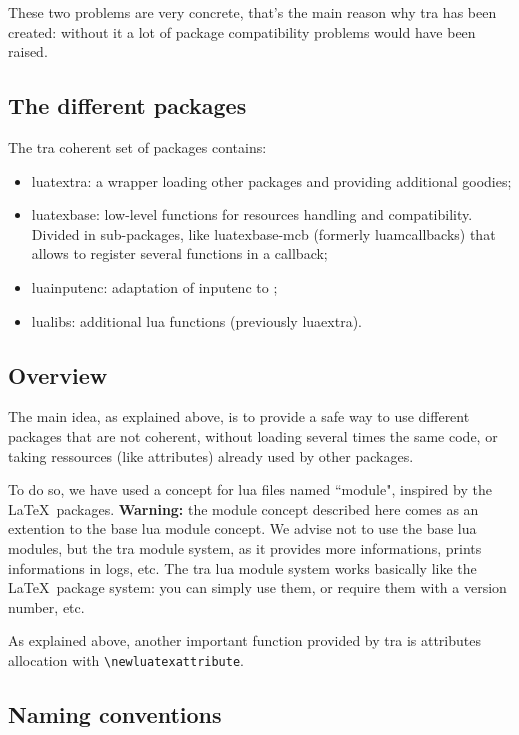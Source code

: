 \documentclass{article}
\newcommand\pf{\textsf}
\begin{document}
These two problems are very concrete, that's the main reason why \LuaTeX tra
has been created: without it a lot of package compatibility problems would
have been raised.

\subsection{The different packages}

The \LuaTeX tra coherent set of packages contains:

\begin{itemize}
  \item \pf{luatextra}: a wrapper loading other packages and providing
    additional goodies;
  \item \pf{luatexbase}: low-level functions for resources handling and
    compatibility. Divided in sub-packages, like \pf{luatexbase-mcb} (formerly
    \pf{luamcallbacks}) that allows to register several functions in a
    callback;
  \item \pf{luainputenc}: adaptation of \pf{inputenc} to \LuaTeX;
  \item \pf{lualibs}: additional lua functions (previously \pf{luaextra}).
\end{itemize}

\subsection{Overview}

The main idea, as explained above, is to provide a safe way to use different
packages that are not coherent, without loading several times the same code,
or taking ressources (like attributes) already used by other packages.

To do so, we have used a concept for lua files named ``module", inspired by
the \LaTeX\ packages. \textbf{Warning:} the module concept described here
comes as an extention to the base lua module concept. We advise not to use the
base lua modules, but the \LuaTeX tra module system, as it provides more
informations, prints informations in logs, etc. The \LuaTeX tra lua module
system works basically like the \LaTeX\ package system: you can simply use
them, or require them with a version number, etc.

As explained above, another important function provided by \LuaTeX tra is
attributes allocation with \verb+\newluatexattribute+.

\subsection{Naming conventions}
\end{document}
